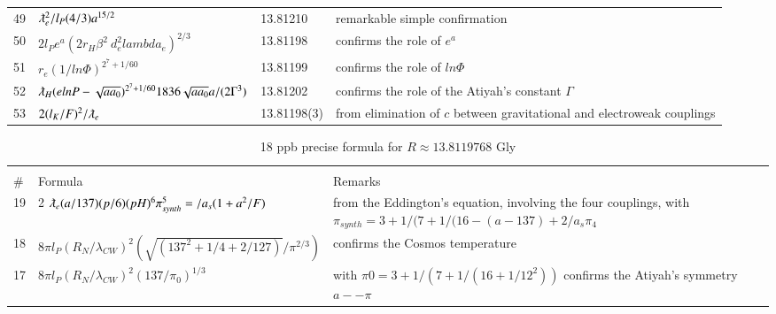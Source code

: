 \documentclass[a4paper,9pt]{article}
\begin{document}
\begin{appendix}
\begin{table}
\begin{tabular}{llll}
    49 & $ \lambdabar_{e}^2/l_P (4/3) a^{15/2}   $ & 13.81210 & remarkable simple confirmation  \\
    
    
    50 & $ 2l_P e^a (2r_H \beta^2 \ d_e^2 lambda_e)^{2/3}   $ & 13.81198 & confirms the role of $e^a$  \\
    
    
    
    51 & $ r_e (1/ln\Phi)^{2^7 + 1/60}   $ & 13.81199 & confirms the role of $ln\Phi$  \\
    
    
    
    
    52 & $ \lambdabar_{H} (elnP-\sqrt{aa_0})^{2^7 + 1/60} 1836 \sqrt{aa_0} a/(2\Gamma^3)   $ & 13.81202& confirms the role of the Atiyah's constant $\Gamma$  \\
    
    
    
    
    
     53 & $ 2(l_K/F)^2/\lambdabar_{e}$ & 13.81198(3) & from elimination of $c$ between gravitational and electroweak couplings \\
   
  
    \bottomrule
  \end{tabular}
\end{table}


\begin{table}
\caption{18 ppb precise formula for $R \approx 13.8119768$ Gly}
\label{tab:8:table8}
  \hskip-2.0cm\begin{tabular}{llll}
    \toprule
    \multicolumn{3}{c}{}                   \\
    \cmidrule(r){1-3}
    \#     & Formula  & Remarks \\
    \midrule
 
 
  19 & 2 $\lambdabar_{e} (a/137) (p/6) (pH)^6\pi_{synth}^5= /a_s (1+a^2/F) $ & from the Eddington's equation, involving the four couplings, with $\pi_{synth} = 3+1/(7 + 1/(16 -(a-137) +2/a_s\pi_4$  \\ 
        
 
  18 & $ 8\pi l_P (R_N/\lambda_{CW})^2 (\sqrt{(137^2 + 1/4 + 2/127)}/\pi^{2/3})   $ & confirms the Cosmos temperature   \\  
   
    17 & $ 8\pi l_P (R_N/\lambda_{CW})^2 (137/\pi_0)^{1/3}   $ & with $\pi0 = 3+1/(7+1/(16+1/12^2))$ confirms the Atiyah's symmetry $a--\pi$    \\
  

\end{tabular}
\end{table}
\end{appendix}
\end{document}
